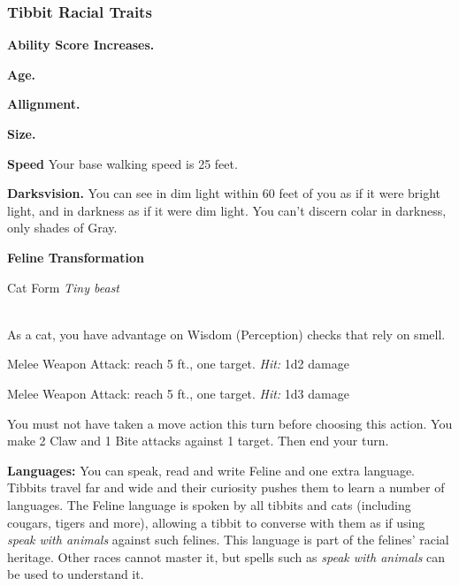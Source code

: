 \subsubsection{Tibbit Racial Traits}
\textbf{Ability Score Increases.}

\textbf{Age.}

\textbf{Allignment.}

\textbf{Size.}

\textbf{Speed} Your base walking speed is 25 feet.

\textbf{Darksvision.} You can see in dim light within 60 feet of you as if it were bright light, and in darkness as if it were dim light. You can't discern colar in 
darkness, only shades of Gray. 

\textbf{Feline Transformation}


\begin{monsterbox}{Cat Form}
	\textit{Tiny beast}\\
	\hline
	\basics[%
	armorclass = As normal but note extra dex from cat form,
	hitpoints  = -,
	speed      = {40 ft, climb 30 ft}
	]
	\hline
	\stats[
	STR = -8 (Minimum 3),
	DEX = +2,
	CON = -,
	INT = -,
	WIS = -,
	CHA = -
	]
	\hline
	\details[
	skills = {Perception + 3, Stealth + 4},
	languages = {Only Feline},
	challenge = -
	]
	\hline \\[1mm]
	\begin{monsteraction}
		As a cat, you have advantage on Wisdom (Perception) checks that rely on smell.
	\end{monsteraction}
	\begin{monsteraction}[Claws]
		Melee Weapon Attack: reach 5 ft., one target.
		\textit{Hit:} 1d2 damage
	\end{monsteraction}

\begin{monsteraction}[Bite]
		Melee Weapon Attack: reach 5 ft., one target.
		\textit{Hit:} 1d3 damage
	\end{monsteraction}

	\begin{monsteraction}[Frenzy]
    You must not have taken a move action this turn before choosing this action. You make 2 Claw and 1 Bite attacks against 1 target. Then end your turn.
	\end{monsteraction}
\end{monsterbox}

\textbf{Languages:} You can speak, read and write Feline and one extra language. Tibbits travel far and wide and their curiosity pushes them to learn a number of languages. The Feline language is spoken by all tibbits and cats (including cougars, tigers and more), allowing a tibbit to converse with them as if using \textit{speak with animals} against such felines. This language is part of the felines' racial heritage. Other races cannot master it, but spells such as \textit{speak with animals} can be used to understand it.
  